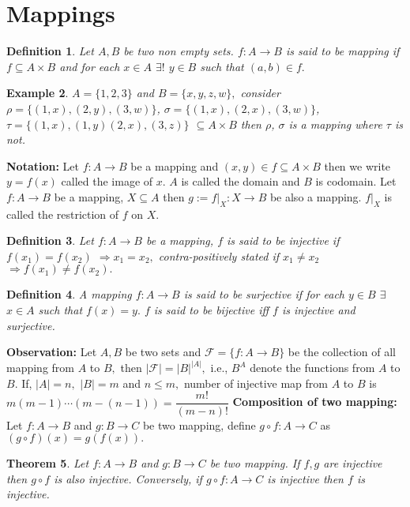 \documentclass[11pt]{amsart}
\newtheorem{theorem}{Theorem}[section]
\newtheorem{definition}[theorem]{Definition}%
\newtheorem{example}[theorem]{Example}%
\begin{document}
\section{Mappings}
\begin{definition} 
Let $A,B$ be two non empty sets. $f: A \rightarrow B$ is said to be mapping if $f \subseteq A \times B$ and for each $x \in A$ $\exists!$ $y \in B$ such that $(a,b) \in f.$
\end{definition}
\begin{example}
$A=\{1,2,3\}$ and $B=\{x,y,z,w\},$ consider $\rho= \{(1,x),(2,y),(3,w)\}$, $\sigma =\{(1,x),(2,x),(3,w)\}$, $\tau=\{(1,x),(1,y)(2,x),(3,z)\}$ $\subseteq A \times B$ then $\rho$, $\sigma$ is a mapping where $\tau$ is not.
\end{example}
\textbf{Notation:} Let $f: A \rightarrow B$ be a mapping and $(x,y) \in f \subseteq A \times B$ then we write $y=f(x)$ called the image of $x.$ $A$ is called the domain and $B$ is codomain. Let $f:A \rightarrow B$ be a mapping, $X\subseteq A$ then $g:=f|_{X}: X \rightarrow B$ be also a mapping. $f|_{X}$ is called the restriction of $f$ on $X.$
\begin{definition} 
Let $f: A \rightarrow B$ be a mapping, $f$ is said to be injective if $f(x_{1})= f(x_{2})$ $\Rightarrow x_{1} = x_{2},$ contra-positively stated if $x_{1} \neq x_{2}$ $\Rightarrow f(x_{1})\neq f(x_{2}).$ 
\end{definition}
\begin{definition}
A mapping  $f: A \rightarrow B$ is said to be surjective if for each $y \in B$ $\exists$ $x \in A$ such that $f(x)=y.$ $f$ is said to be bijective iff $f$ is injective and surjective.
\end{definition}
\textbf{Observation:} Let $A,B$ be two sets and $ \mathcal{F}=\{f: A \rightarrow B\}$ be the collection of all mapping from $A$ to $B,$ then $|\mathcal{F}|=|B|^{|A|},$ i.e., $B^{A}$ denote the functions from $A$ to $B.$ If, $|A|=n,$ $|B|=m$ and $n\leq m,$ number of injective map from $A$ to $B$ is $m(m-1)\cdots(m-(n-1))=\dfrac{m!}{(m-n)!}$
\newline\textbf{Composition of two mapping:} Let $f: A \rightarrow B$ and $g: B \rightarrow C$ be two mapping, define $g\circ f: A \rightarrow C$ as $(g\circ f)(x)=g(f(x)).$
\begin{theorem}
Let $f: A \rightarrow B$ and $g: B \rightarrow C$ be two mapping. If $f,g$ are injective then $g \circ f$ is also injective. Conversely, if $g\circ f:A \rightarrow C$ is injective then $f$ is injective.
\end{theorem}
\end{document}
